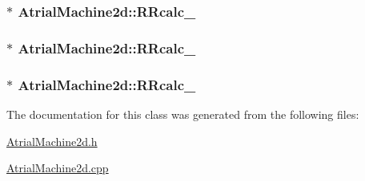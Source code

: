 \hypertarget{class_atrial_machine2d_a34b1581457faa0fec1579cf51a187598}{
\subsubsection[{R\+Rcalc\+\_\+2}]{$\ast$ Atrial\+Machine2d\+::\+R\+Rcalc\+\_}}\label{class_atrial_machine2d_a34b1581457faa0fec1579cf51a187598}
\hypertarget{class_atrial_machine2d_a0bcbe6368dd8bb0eb66efaafc5a4dbfb}{
\subsubsection[{R\+Rcalc\+\_\+3}]{$\ast$ Atrial\+Machine2d\+::\+R\+Rcalc\+\_}}\label{class_atrial_machine2d_a0bcbe6368dd8bb0eb66efaafc5a4dbfb}
\hypertarget{class_atrial_machine2d_aa2ede01ca50864789c112cca567c1444}{
\subsubsection[{R\+Rcalc\+\_\+4}]{$\ast$ Atrial\+Machine2d\+::\+R\+Rcalc\+\_}}\label{class_atrial_machine2d_aa2ede01ca50864789c112cca567c1444}


The documentation for this class was generated from the following files\+:\begin{DoxyCompactItemize}
\item 
\hyperlink{_atrial_machine2d_8h}{Atrial\+Machine2d.\+h}\item 
\hyperlink{_atrial_machine2d_8cpp}{Atrial\+Machine2d.\+cpp}\end{DoxyCompactItemize}
